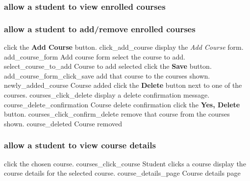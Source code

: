 \documentclass[12pt]{article}
\newenvironment{requirement}[1]
{
    \renewcommand{\thesubsubsection}{R\arabic{subsubsection}.}
    \renewcommand{\labelenumi}{
        \arabic{subsubsection}.\arabic{enumi}
    }
    \renewcommand{\labelenumii}{
        \arabic{subsubsection}.\arabic{enumi}.\arabic{enumii}
    }
    \renewcommand{\labelenumiii}{
        \arabic{subsubsection}.\arabic{enumi}.\arabic{enumii}.\arabic{enumiii}
    }
    \renewcommand{\labelenumiv}{
        \arabic{subsubsection}.\arabic{enumi}.\arabic{enumii}.\arabic{enumiii}.\arabic{enumiv}
    }
    \subsubsection{#1}
    \begin{enumerate}
}
{
    \end{enumerate}
}
\begin{document}
\begin{requirement}{\sysshall allow a student to view enrolled courses}
    \navcourses
\end{requirement}

\begin{requirement}{\sysshall allow a student to add/remove enrolled courses}
    \navcourses
    \screenshotstep
      {\stushall click the \textbf{Add Course} button.}
      {click_add_course}
      {}
    \screenshotstep
      {\sysshall display the \emph{Add Course} form.}
      {add_course_form}
      {Add course form}
    \screenshotstep
      {\stushall select the course to add.}
      {select_course_to_add}
      {Course to add selected}
    \screenshotstep
      {\stushall click the \textbf{Save} button.}
      {add_course_form_click_save}
      {}
    \screenshotstep
      {\sysshall add that course to the courses shown.}
      {newly_added_course}
      {Course added}
    \screenshotstep
      {\stushall click the \textbf{Delete} button next to one of the courses.}
      {courses_click_delete}
      {}
    \screenshotstep
      {\sysshall display a delete confirmation message.}
      {course_delete_confirmation}
      {Course delete confirmation}
    \screenshotstep
      {\stushall click the \textbf{Yes, Delete} button.}
      {courses_click_confirm_delete}
      {}
    \screenshotstep
      {\sysshall remove that course from the courses shown.}
      {course_deleted}
      {Course removed}
\end{requirement}

\newcommand{\navcoursedetails}{
    \navcourses
    \screenshotstep
      {\stushall click the chosen course.}
      {courses_click_course}
      {Student clicks a course}
    \screenshotstep
      {\sysshall display the course details for the selected course.}
      {course_details_page}
      {Course details page}
}

\begin{requirement}{\sysshall allow a student to view course details}
    \navcoursedetails
\end{requirement}
\end{document}
